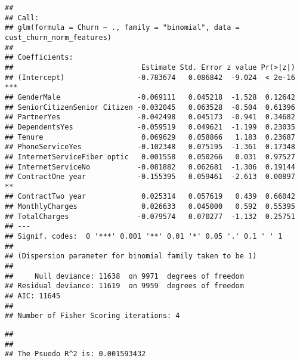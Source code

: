 \documentclass[
]{article}
\newenvironment{Shaded}{\begin{snugshade}}{\end{snugshade}}
\newcommand{\DecValTok}[1]{\textcolor[rgb]{0.00,0.00,0.81}{#1}}
\newcommand{\FunctionTok}[1]{\textcolor[rgb]{0.13,0.29,0.53}{\textbf{#1}}}
\newcommand{\NormalTok}[1]{#1}
\newcommand{\OtherTok}[1]{\textcolor[rgb]{0.56,0.35,0.01}{#1}}
\newcommand{\SpecialCharTok}[1]{\textcolor[rgb]{0.81,0.36,0.00}{\textbf{#1}}}
\newcommand{\StringTok}[1]{\textcolor[rgb]{0.31,0.60,0.02}{#1}}
\begin{document}
\begin{verbatim}
## 
## Call:
## glm(formula = Churn ~ ., family = "binomial", data = cust_churn_norm_features)
## 
## Coefficients:
##                              Estimate Std. Error z value Pr(>|z|)    
## (Intercept)                 -0.783674   0.086842  -9.024  < 2e-16 ***
## GenderMale                  -0.069111   0.045218  -1.528  0.12642    
## SeniorCitizenSenior Citizen -0.032045   0.063528  -0.504  0.61396    
## PartnerYes                  -0.042498   0.045173  -0.941  0.34682    
## DependentsYes               -0.059519   0.049621  -1.199  0.23035    
## Tenure                       0.069629   0.058866   1.183  0.23687    
## PhoneServiceYes             -0.102348   0.075195  -1.361  0.17348    
## InternetServiceFiber optic   0.001558   0.050266   0.031  0.97527    
## InternetServiceNo           -0.081882   0.062681  -1.306  0.19144    
## ContractOne year            -0.155395   0.059461  -2.613  0.00897 ** 
## ContractTwo year             0.025314   0.057619   0.439  0.66042    
## MonthlyCharges               0.026633   0.045000   0.592  0.55395    
## TotalCharges                -0.079574   0.070277  -1.132  0.25751    
## ---
## Signif. codes:  0 '***' 0.001 '**' 0.01 '*' 0.05 '.' 0.1 ' ' 1
## 
## (Dispersion parameter for binomial family taken to be 1)
## 
##     Null deviance: 11638  on 9971  degrees of freedom
## Residual deviance: 11619  on 9959  degrees of freedom
## AIC: 11645
## 
## Number of Fisher Scoring iterations: 4
\end{verbatim}

\begin{Shaded}
\end{Shaded}

\begin{verbatim}
## 
## 
## The Psuedo R^2 is: 0.001593432
\end{verbatim}
\end{document}
